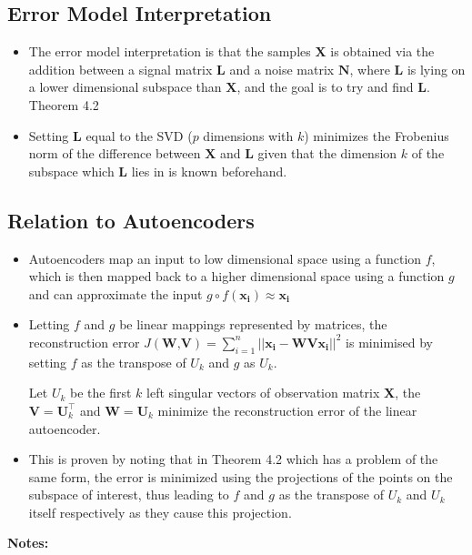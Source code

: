\documentclass[english]{latex4ei/latex4ei_sheet}
\begin{document}
\begin{sectionbox}
\subsection{Error Model Interpretation}
\begin{itemize}
\item The error model interpretation is that the samples $\boldsymbol{X}$ is obtained via the addition between a signal matrix $\boldsymbol{L}$ and a noise matrix $\boldsymbol{N}$, where $\boldsymbol{L}$ is lying on a lower dimensional subspace than $\boldsymbol{X}$, and the goal is to try and find $\boldsymbol{L}$.
Theorem 4.2
\item Setting $\boldsymbol{L}$ equal to the SVD ($p$ dimensions with $k$) minimizes the Frobenius norm of the difference between $\boldsymbol{X}$ and $\boldsymbol{L}$ given that the dimension $k$ of the subspace which $\boldsymbol{L}$ lies in is known beforehand.
\end{itemize}

\subsection{Relation to Autoencoders}
\begin{itemize}
    \item Autoencoders map an input to low dimensional space using a function $f$, which is then mapped back to a higher dimensional space using a function $g$ and can approximate the input $g\circ f(\boldsymbol{x_i})\approx\boldsymbol{x_i}$
\item Letting $f$ and $g$ be linear mappings represented by matrices, the reconstruction error $J(\textbf{W,V})=\sum_{i=1}^n||\boldsymbol{x_i-WVx_i}||^2$ is minimised by setting $f$ as the transpose of $U_k$ and $g$ as $U_k$.
\begin{emphbox}
    Let \textbf{$U_k$} be the first $k$ left singular vectors of observation matrix \textbf{X}, the $\textbf{V}=\textbf{U}_k^{\top}$ and $\textbf{W}=\textbf{U}_k$ minimize the reconstruction error of the linear autoencoder.
\end{emphbox}
\item This is proven by noting that in Theorem 4.2 which has a problem of the same form, the error is minimized using the projections of the points on the subspace of interest, thus leading to $f$ and $g$ as the transpose of $U_k$ and $U_k$ itself respectively as they cause this projection.

\end{itemize}
\end{sectionbox}
\textbf{Notes:}
\end{document}
